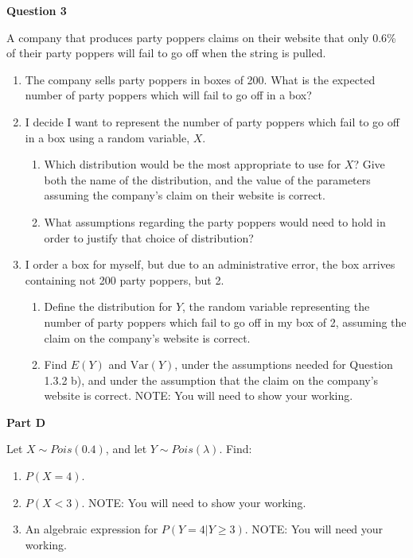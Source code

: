 \documentclass[11pt,a4paper]{article}
\begin{document}
 
\textbf{Question 3}
\vspace{0.2cm}

A company that produces party poppers claims on their website that only 0.6\% of their party poppers will fail to go off when the string is pulled.
\begin{enumerate}
\item The company sells party poppers in boxes of 200. What is the expected number of party poppers which will fail to go off in a box?
\item I decide I want to represent the number of party poppers which fail to go off in a box using a random variable, $X$.
\begin{enumerate}
\item Which distribution would be the most appropriate to use for $X$? Give both the name of the distribution, and the value of the parameters assuming the company's claim on their website is correct.
\item What assumptions regarding the party poppers would need to hold in order to justify that choice of distribution?
\end{enumerate}
\item I order a box for myself, but due to an administrative error, the box arrives containing not 200 party poppers, but 2.
\begin{enumerate}
\item Define the distribution for $Y$, the random variable representing the number of party poppers which fail to go off in my box of 2, assuming the claim on the company's website is correct.
\item Find $E(Y)$ and $\textrm{Var}(Y)$, under the assumptions needed for Question 1.3.2 b), and under the assumption that the claim on the company's website is correct. NOTE: You will need to show your working.
\end{enumerate}
\end{enumerate}



\textbf{Part D}
\vspace{0.2cm}


Let $X\sim Pois(0.4)$, and let $Y\sim Pois(\lambda)$. Find:
\begin{enumerate}
\item $P(X=4)$.
\item $P(X<3)$. NOTE: You will need to show your working.
\item An algebraic expression for $P(Y=4|Y\geq3)$. NOTE: You will need your working.
\end{enumerate} 
\end{document}
